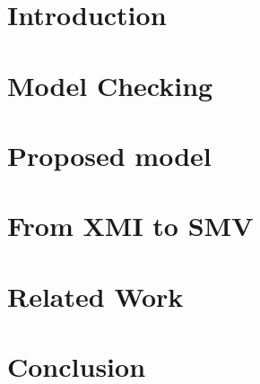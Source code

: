 \documentclass{entcs}
\begin{document}
\section{Introduction}\label{introduction}


\section{Model Checking}\label{modelchecking}


\section{Proposed model}\label{model}


\section{From XMI to SMV}\label{xmi}


\section{Related Work}\label{related}


\section{Conclusion}




\end{document}
